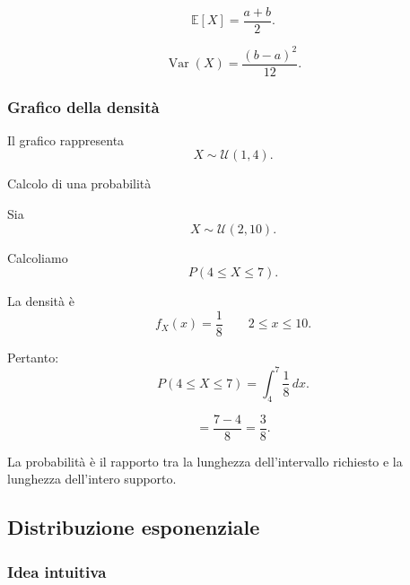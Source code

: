 \[
\boxed{
\mathbb{E}[X]=\frac{a+b}{2}.
}
\]

\[
\boxed{
\operatorname{Var}(X)=\frac{(b-a)^2}{12}.
}
\]

\subsubsection{Grafico della densità}

\begin{center}
\end{center}

Il grafico rappresenta
\[
X\sim\mathcal{U}(1,4).
\]

\begin{example}{Calcolo di una probabilità}

Sia
\[
X\sim\mathcal{U}(2,10).
\]

Calcoliamo
\[
P(4\leq X\leq7).
\]

La densità è
\[
f_X(x)=\frac18
\qquad 2\leq x\leq10.
\]

Pertanto:
\[
P(4\leq X\leq7)
=
\int_4^7\frac18\,dx.
\]

\[
=
\frac{7-4}{8}
=
\boxed{\frac38}.
\]

La probabilità è il rapporto
tra la lunghezza dell'intervallo
richiesto e la lunghezza
dell'intero supporto.
\end{example}


\subsection{Distribuzione esponenziale}

\subsubsection{Idea intuitiva}

